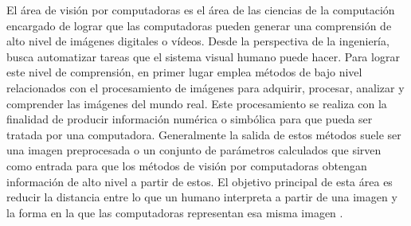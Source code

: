 \documentclass[a4paper,11pt,spanish]{book}
\begin{document}
    El área de visión por computadoras es el área de las ciencias de la computación encargado de lograr que las computadoras pueden generar una comprensión de alto 
    nivel de imágenes digitales o vídeos.
    Desde la perspectiva de la ingeniería, busca automatizar tareas que el sistema visual humano puede hacer. 
    Para lograr este nivel de comprensión, en primer lugar emplea métodos de bajo nivel relacionados con el procesamiento de imágenes para adquirir, procesar, analizar 
    y comprender las imágenes del mundo real. 
    Este procesamiento se realiza con la finalidad de producir información numérica o simbólica para que pueda ser tratada por una computadora. 
    Generalmente la salida de estos métodos suele ser una imagen preprocesada o un conjunto de parámetros calculados que sirven como entrada
    para que los métodos de visión por computadoras obtengan información de alto nivel a partir de estos.
    El objetivo principal de esta área es reducir la distancia entre lo que un humano interpreta a partir de una imagen y la forma en la que las computadoras 
    representan esa misma imagen \cite{Szeliski:ComputerVision}.
\end{document}
